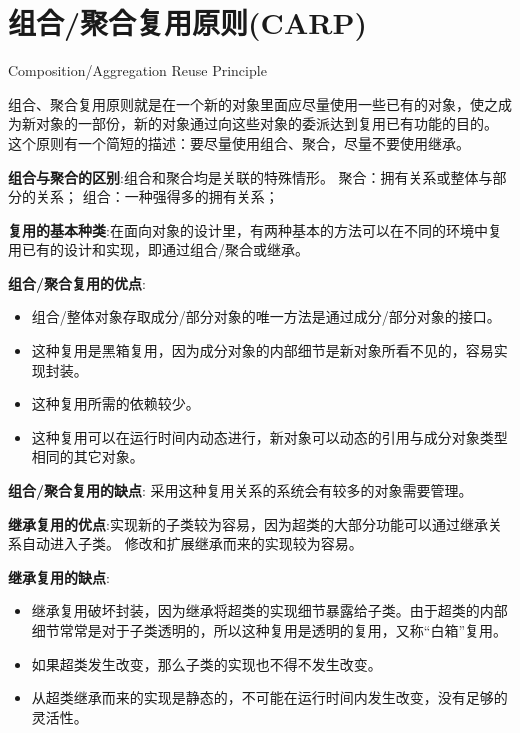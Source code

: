 \documentclass[../main.tex]{subfiles}
\begin{document}
\section{组合/聚合复用原则(CARP)}
Composition/Aggregation Reuse Principle

组合、聚合复用原则就是在一个新的对象里面应尽量使用一些已有的对象，使之成为新对象的一部份，新的对象通过向这些对象的委派达到复用已有功能的目的。
这个原则有一个简短的描述：要尽量使用组合、聚合，尽量不要使用继承。

\noindent \textbf{组合与聚合的区别}:组合和聚合均是关联的特殊情形。
聚合：拥有关系或整体与部分的关系；
组合：一种强得多的拥有关系；

\textbf{复用的基本种类}:在面向对象的设计里，有两种基本的方法可以在不同的环境中复用已有的设计和实现，即通过组合/聚合或继承。

\noindent \textbf{组合/聚合复用的优点}:
\begin{itemize}
  \item 组合/整体对象存取成分/部分对象的唯一方法是通过成分/部分对象的接口。
  \item 这种复用是黑箱复用，因为成分对象的内部细节是新对象所看不见的，容易实现封装。
  \item 这种复用所需的依赖较少。
  \item 这种复用可以在运行时间内动态进行，新对象可以动态的引用与成分对象类型相同的其它对象。
\end{itemize}
\noindent \textbf{组合/聚合复用的缺点}:
采用这种复用关系的系统会有较多的对象需要管理。

\noindent \textbf{继承复用的优点}:实现新的子类较为容易，因为超类的大部分功能可以通过继承关系自动进入子类。
修改和扩展继承而来的实现较为容易。

\noindent \textbf{继承复用的缺点}:
\begin{itemize}
  \item 继承复用破坏封装，因为继承将超类的实现细节暴露给子类。由于超类的内部细节常常是对于子类透明的，所以这种复用是透明的复用，又称“白箱”复用。
  \item 如果超类发生改变，那么子类的实现也不得不发生改变。
  \item 从超类继承而来的实现是静态的，不可能在运行时间内发生改变，没有足够的灵活性。
\end{itemize}
\end{document}
